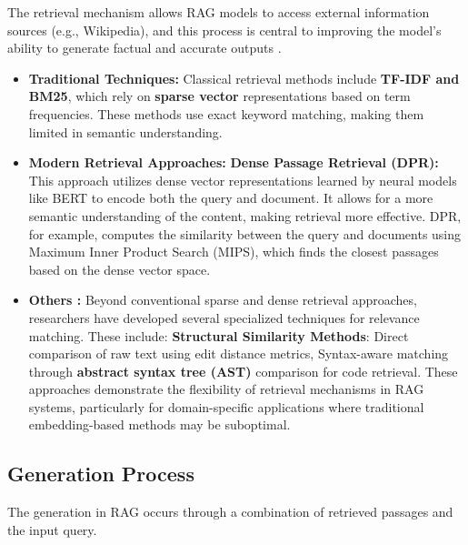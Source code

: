 The retrieval mechanism allows RAG models to access external information sources (e.g., Wikipedia), and this process is central to improving the model's ability to generate factual and accurate outputs .
\begin{itemize}
	\item\textbf{Traditional Techniques:} 
	Classical retrieval methods include \textbf{TF-IDF and BM25}, which rely on \textbf{sparse vector} representations based on term frequencies. These methods use exact keyword matching, making them limited in semantic understanding.
	\item \textbf{Modern Retrieval Approaches:}
	\textbf{Dense Passage Retrieval (DPR): }This approach utilizes dense vector representations learned by neural models like BERT to encode both the query and document. It allows for a more semantic understanding of the content, making retrieval more effective\citep{karpukhin2020dense}. DPR, for example, computes the similarity between the query and documents using Maximum Inner Product Search (MIPS), which finds the closest passages based on the dense vector space.
	\item \textbf{Others :}
	Beyond conventional sparse and dense retrieval approaches, researchers have developed several specialized techniques for relevance matching. These include:
	\textbf{Structural Similarity Methods}:
	Direct comparison of raw text using edit distance metrics, Syntax-aware matching through \textbf{abstract syntax tree (AST)} comparison for code retrieval.
    These approaches demonstrate the flexibility of retrieval mechanisms in RAG systems, particularly for domain-specific applications where traditional embedding-based methods may be suboptimal.
	
\end{itemize}

\subsection{Generation Process}
The generation in RAG occurs through a combination of retrieved passages and the input query.

